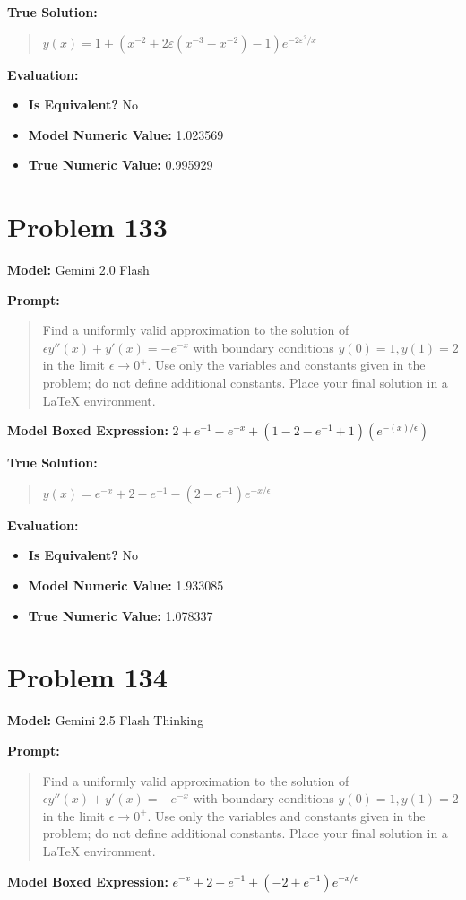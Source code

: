\documentclass{article}
\begin{document}
{\textbf{True Solution:}
\begin{quote}
$y(x) = 1 + \left( x^{-2} + 2\varepsilon(x^{-3} - x^{-2}) - 1 \right) e^{-2\varepsilon^2 / x}$
\end{quote}

\textbf{Evaluation:}
\begin{itemize}
\item \textbf{Is Equivalent?} No
\item \textbf{Model Numeric Value:} 1.023569
\item \textbf{True Numeric Value:} 0.995929
\end{itemize}
\vspace{1cm}
\section*{Problem 133}
\textbf{Model:} Gemini 2.0 Flash

\textbf{Prompt:}
\begin{quote}
Find a uniformly valid approximation to the solution of $\epsilon y''(x) + y'(x) = -e^{-x}$ with boundary conditions $y(0) = 1, y(1) = 2$ in the limit $\epsilon \to 0^+$. Use only the variables and constants given in the problem; do not define additional constants. Place your final solution in a $\boxed{}$ LaTeX environment.
\end{quote}
\textbf{Model Boxed Expression:} $2 + e^{-1} - e^{-x} + (1 - 2 - e^{-1} + 1)(e^{-(x)/\epsilon})$

\textbf{True Solution:}
\begin{quote}
$y(x) = e^{-x} + 2 - e^{-1} - (2 - e^{-1})e^{-x/\epsilon}$
\end{quote}

\textbf{Evaluation:}
\begin{itemize}
\item \textbf{Is Equivalent?} No
\item \textbf{Model Numeric Value:} 1.933085
\item \textbf{True Numeric Value:} 1.078337
\end{itemize}
\vspace{1cm}
\section*{Problem 134}
\textbf{Model:} Gemini 2.5 Flash Thinking

\textbf{Prompt:}
\begin{quote}
Find a uniformly valid approximation to the solution of $\epsilon y''(x) + y'(x) = -e^{-x}$ with boundary conditions $y(0) = 1, y(1) = 2$ in the limit $\epsilon \to 0^+$. Use only the variables and constants given in the problem; do not define additional constants. Place your final solution in a $\boxed{}$ LaTeX environment.
\end{quote}
\textbf{Model Boxed Expression:} $e^{-x} + 2 - e^{-1} + (-2 + e^{-1})e^{-x/\epsilon}$

}
\end{document}
